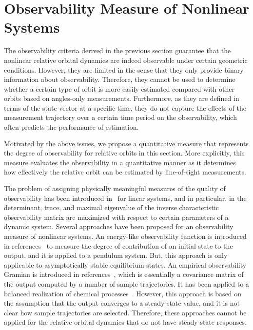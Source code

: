 

\section{Observability Measure of Nonlinear Systems}

The observability criteria derived in the previous section guarantee that the nonlinear relative orbital dynamics are indeed observable under certain geometric conditions. However, they are limited in the sense that they only provide binary information about observability. Therefore, they cannot be used to determine whether a certain type of orbit is more easily estimated compared with other orbits based on angles-only measurements. Furthermore, as they are defined in terms of the state vector at a specific time, they do not capture the effects of the measurement trajectory over a certain time period on the observability, which often predicts the performance of estimation.

Motivated by the above issues, we propose a quantitative measure that represents the degree of observability for relative orbits in this section. More explicitly, this measure evaluates the observability in a quantitative manner as it determines how effectively the relative orbit can be estimated by line-of-sight measurements. 

The problem of assigning physically meaningful measures of the quality of observability has been introduced in~\cite{BroPNEC66,MonITAC67,MulWebA72} for linear systems, and in particular, in \cite{MulWebA72} the determinant, trace, and maximal eigenvalue of the inverse characteristic observability matrix are maximized with respect to certain parameters of a dynamic system. Several approaches have been proposed for an observability measure of nonlinear systems. 
An energy-like observability function is introduced in references~\cite{SchSCL93,Sch94,NewKriPICDC98} to measure the degree of contribution of an initial state to the output, and it is applied to a pendulum system. But, this approach is only applicable to asymptotically stable equilibrium states. An empirical observability Gramian is introduced in references~\cite{LalMarPIWC99,LalMarIJRNC02}, which is essentially a covariance matrix of the output computed by a number of sample trajectories.
It has been applied to a balanced realization of chemical processes~\cite{HahEdgJPC03,HahEdgCCE02}. However, this approach is based on the assumption that the output converges to a steady-state value, and it is not clear how sample trajectories are selected. Therefore, these approaches cannot be applied for the relative orbital dynamics that do not have steady-state responses. 

